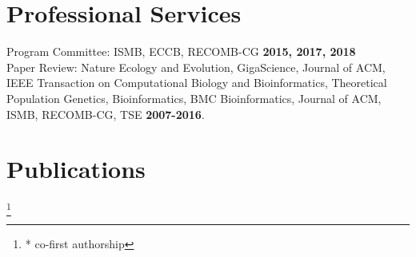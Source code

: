 \documentclass[margin,line,letterpaper]{resume}
\begin{document}
\begin{resume}
\begin{small}
   \section{\mysidestyle Professional Services}
    Program Committee: ISMB, ECCB, RECOMB-CG  \hfill \textbf{2015, 2017, 2018}\vspace{1mm}\\
    Paper Review:  Nature Ecology and Evolution, GigaScience, Journal of ACM, IEEE Transaction on Computational Biology and Bioinformatics, Theoretical Population Genetics, Bioinformatics, BMC Bioinformatics, Journal of ACM, ISMB, RECOMB-CG, TSE   \hfill \textbf{2007-2016}. %

    \renewcommand*{\thefootnote}{\fnsymbol{footnote}}
    \section{\mysidestyle Publications}

\newcommand\blfootnote[1]{%
  \begingroup
  \renewcommand\thefootnote{}\footnote{#1}%
  \addtocounter{footnote}{-1}%
  \endgroup
}
    

\begin{footnotesize}
\vspace{-10pt}
\begin{spacing}{-1.4}

\end{spacing}
\blfootnote{* co-first authorship}
\end{footnotesize}


\end{small}
\end{resume}
\end{document}
